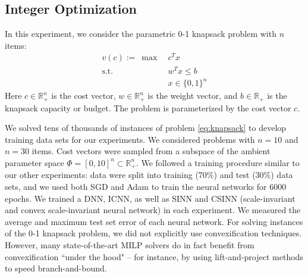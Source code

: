 \documentclass[10pt]{article} %
\theoremstyle{plain}
\theoremstyle{definition}
\theoremstyle{remark}
\begin{document}
\subsection{Integer Optimization}

In this experiment, we consider the parametric 0-1 knapsack problem with $n$ items:
\begin{align}
    v(c) :=~\max~& c^Tx \label{eq:knapsack} \\
    \text{s.t.}~& w^T x \leq b \nonumber \\
    &x \in \{0, 1\}^n \nonumber
\end{align}
Here $c \in \mathbb{R}^n_+$ is the cost vector, $w \in \mathbb{R}^n_+$ is the weight vector, and $b \in \mathbb{R}_+$ is the knapsack capacity or budget. The problem is parameterized by the cost vector $c$.

We solved tens of thousands of instances of problem \eqref{eq:knapsack} to develop training data sets for our experiments.
We considered problems with $n = 10$ and $n = 30$ items. 
Cost vectors were sampled from a subspace of the ambient parameter space $\Phi = [0, 10]^n\subset \mathbb{R}^n_+$. 
We followed a training procedure similar to our other experiments: data were split into training (70\%) and test (30\%) data sets, and we used both SGD and Adam to train the neural networks for 6000 epochs. We trained a DNN, ICNN, as well as SINN and CSINN (scale-invariant and convex scale-invariant neural network) in each experiment. We measured the average and maximum test set error of each neural network.
For solving instances of the 0-1 knapsack problem, we did not explicitly use convexification techniques. However, many state-of-the-art MILP solvers do in fact benefit from convexification ``under the hood" -- for instance, by using lift-and-project methods to speed branch-and-bound.
\end{document}
